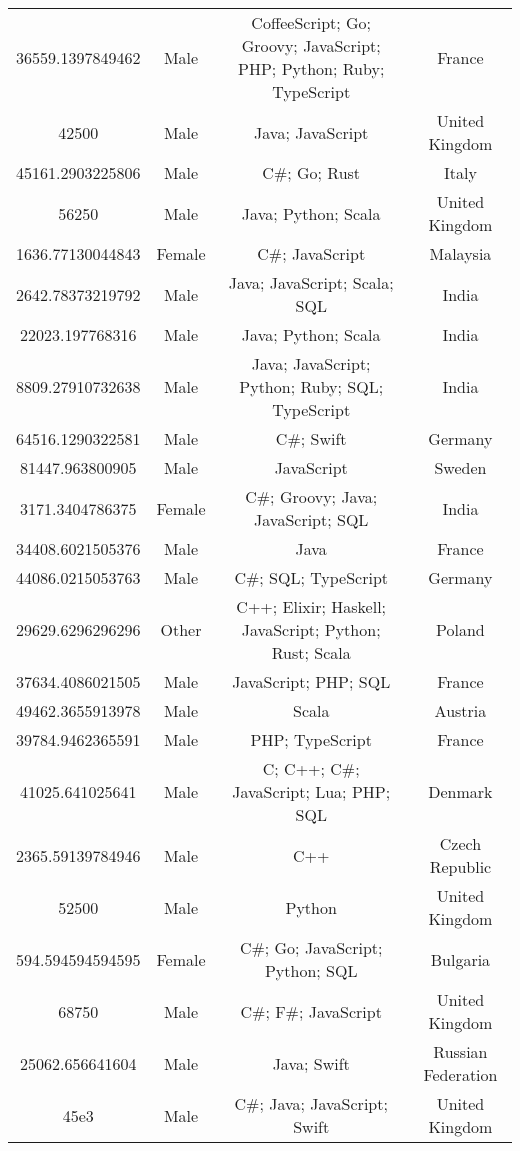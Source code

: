 \begin{center}
\begin{tabular}{ |c|c|c|c| }
36559.1397849462  &  Male  &  CoffeeScript; Go; Groovy; JavaScript; PHP; Python; Ruby; TypeScript  &  France  \\ 
42500  &  Male  &  Java; JavaScript  &  United Kingdom  \\ 
45161.2903225806  &  Male  &  C\#; Go; Rust  &  Italy  \\ 
56250  &  Male  &  Java; Python; Scala  &  United Kingdom  \\ 
1636.77130044843  &  Female  &  C\#; JavaScript  &  Malaysia  \\ 
2642.78373219792  &  Male  &  Java; JavaScript; Scala; SQL  &  India  \\ 
22023.197768316  &  Male  &  Java; Python; Scala  &  India  \\ 
8809.27910732638  &  Male  &  Java; JavaScript; Python; Ruby; SQL; TypeScript  &  India  \\ 
64516.1290322581  &  Male  &  C\#; Swift  &  Germany  \\ 
81447.963800905  &  Male  &  JavaScript  &  Sweden  \\ 
3171.3404786375  &  Female  &  C\#; Groovy; Java; JavaScript; SQL  &  India  \\ 
34408.6021505376  &  Male  &  Java  &  France  \\ 
44086.0215053763  &  Male  &  C\#; SQL; TypeScript  &  Germany  \\ 
29629.6296296296  &  Other  &  C++; Elixir; Haskell; JavaScript; Python; Rust; Scala  &  Poland  \\ 
37634.4086021505  &  Male  &  JavaScript; PHP; SQL  &  France  \\ 
49462.3655913978  &  Male  &  Scala  &  Austria  \\ 
39784.9462365591  &  Male  &  PHP; TypeScript  &  France  \\ 
41025.641025641  &  Male  &  C; C++; C\#; JavaScript; Lua; PHP; SQL  &  Denmark  \\ 
2365.59139784946  &  Male  &  C++  &  Czech Republic  \\ 
52500  &  Male  &  Python  &  United Kingdom  \\ 
594.594594594595  &  Female  &  C\#; Go; JavaScript; Python; SQL  &  Bulgaria  \\ 
68750  &  Male  &  C\#; F\#; JavaScript  &  United Kingdom  \\ 
25062.656641604  &  Male  &  Java; Swift  &  Russian Federation  \\ 
45e3  &  Male  &  C\#; Java; JavaScript; Swift  &  United Kingdom  \\ 

\end{tabular}
\end{center}
